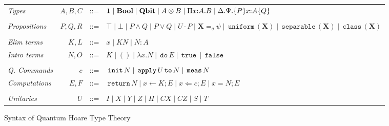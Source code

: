 \documentclass[acmsmall,nonacm,timestamp,review=false,anonymous=false]{acmart}
\newcommand{\type}[1]{\textrm{\textbf{#1}}}
\newcommand{\kw}[1]{\,\mathrm{\texttt{#1}}\,}
\begin{document}
\begin{figure}[ht]
	\begin{tabular}{lrcl}
		\textit{Types} & $A, B, C$ & ::= &
		\begin{minipage}[t]{0.45\columnwidth}%
			$ \type{1} \mid \type{Bool} \mid \type{Qbit} \mid A \otimes B \mid \Pi x{ : }A.B \mid \Delta. \Psi .\{P\} x{ : }A \{Q\}$
		\end{minipage}\\ \\
		\textit{Propositions} & $P, Q, R$ & ::= &
		\begin{minipage}[t]{0.5\columnwidth}%
			$ \top \mid \bot \mid P \wedge Q \mid P \vee Q \mid U \cdot P \mid \textbf{X} =_q \psi \mid \kw{uniform}(\textbf{X}) \mid \kw{separable}(\textbf{X}) \mid \kw{class}(\textbf{X}) $
		\end{minipage}\\ \\
		\textit{Elim terms} & $K, L$ & ::= & $ x \mid K N \mid N : A $\\
		\textit{Intro terms} & $N, O$ & ::= & $ K \mid () \mid \lambda x.N \mid \kw{do} E \mid \kw{true} \mid \kw{false} $\\ \\
		\textit{Q. Commands} & $c$ & ::= &
		\begin{minipage}[t]{0.5\columnwidth}%
			$ \kw{\textbf{init}} N \mid \kw{\textbf{apply}} U \kw{\textbf{to}} N \mid \kw{\textbf{meas}} N$
		\end{minipage}\\
		\textit{Computations} & $E, F$ & ::= & $ \kw{return} N \mid x \leftarrow K; E \mid x \Leftarrow c; E \mid x = N; E $\\ \\
		\textit{Unitaries} & $U$ & ::= & $ I \mid X \mid Y \mid Z \mid H \mid CX \mid CZ \mid S \mid T$
	\end{tabular}
	\caption{Syntax of Quantum Hoare Type Theory}
	\label{fig:syntax}
\end{figure}
\end{document}

